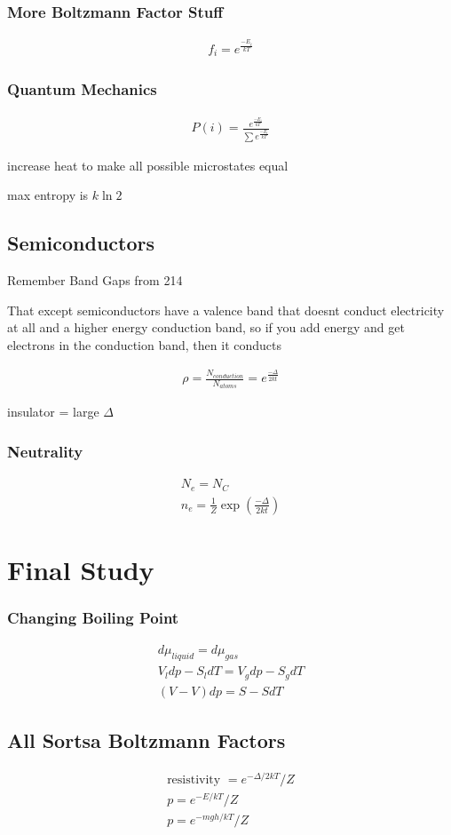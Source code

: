 \documentclass[fleqn]{report}
\newcommand{\equations}[1]{
\begin{gather*}
#1
\end{gather*}
}
\begin{document}
\subsection{More Boltzmann Factor Stuff}
\equations{
f_i = e^{\frac{-E_i}{kT}}
}

\subsection{Quantum Mechanics}
\equations{
P(i) = \frac{ e^{\frac{-E_i}{kT}}}{ \sum e^{\frac{-E_i}{kT}}}
}

increase heat to make all possible microstates equal

max entropy is $k \ln 2$

\section{Semiconductors}
Remember Band Gaps from 214

That except semiconductors have a valence band that doesnt conduct electricity at all and a higher energy conduction band, so if you add energy and get electrons in the conduction band, then it conducts

\equations{
\rho = \frac{N_{conduction}}{N_{atoms}} = e^{\frac{- \Delta}{2kt}}
}

insulator = large $\Delta$

\subsection{Neutrality}
\equations{
N_e = N_C
\\
n_e = \frac{1}{Z} \exp(\frac{- \Delta}{2kt})
}


\chapter{Final Study}

\subsection{Changing Boiling Point}
\equations{
d \mu_{liquid} = d \mu_{gas}
\\
V_l dp - S_l dT = V_g dp - S_g dT
\\
(V - V) dp = S - S dT
}

\section{All Sortsa Boltzmann Factors}
\equations{
\textrm{resistivity } = e^{-\Delta / 2kT} / Z
\\
p = e^{-E/kT} / Z
\\
p = e^{-mgh/kT} / Z
}
\end{document}
